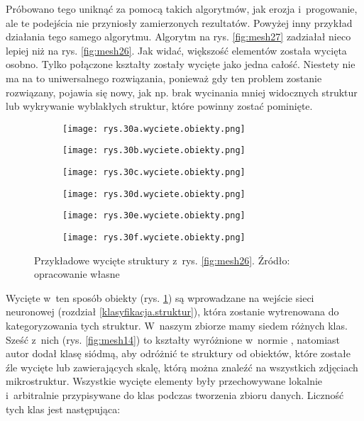 Próbowano tego uniknąć za pomocą takich algorytmów, jak erozja i~progowanie, ale te podejścia nie przyniosły zamierzonych rezultatów. Powyżej inny przykład działania tego samego algorytmu.
Algorytm na rys. \ref{fig:mesh27} zadziałał nieco lepiej niż na rys. \ref{fig:mesh26}. Jak widać, większość elementów została wycięta osobno. Tylko połączone kształty zostały wycięte jako jedna całość. Niestety nie ma na to uniwersalnego rozwiązania, ponieważ gdy ten problem zostanie rozwiązany, pojawia się nowy, jak np. brak wycinania mniej widocznych struktur lub wykrywanie wyblakłych struktur, które powinny zostać pominięte.
\begin{figure}[h]
	\centering
	\begin{subfigure}{0.29\textwidth}
	    \centering
	    \texttt{[image: rys.30a.wyciete.obiekty.png]}
	\end{subfigure}
	\begin{subfigure}{0.29\textwidth}
	    \centering
	    \texttt{[image: rys.30b.wyciete.obiekty.png]}
	\end{subfigure}
	\begin{subfigure}{0.29\textwidth}
	    \centering
	    \texttt{[image: rys.30c.wyciete.obiekty.png]}
	\end{subfigure}
	\begin{subfigure}{0.29\textwidth}
	    \centering
	    \texttt{[image: rys.30d.wyciete.obiekty.png]}
	\end{subfigure}
	\begin{subfigure}{0.29\textwidth}
	    \centering
	    \texttt{[image: rys.30e.wyciete.obiekty.png]}
	\end{subfigure}
	\begin{subfigure}{0.29\textwidth}
	    \centering
	    \texttt{[image: rys.30f.wyciete.obiekty.png]}
	\end{subfigure}
	\caption{\label{fig:mesh28}Przykładowe wycięte struktury z~rys. \ref{fig:mesh26}. Źródło: opracowanie własne}
\end{figure}
Wycięte w~ten sposób obiekty (rys. \ref{fig:mesh28}) są wprowadzane na wejście sieci neuronowej (rozdział \ref{klasyfikacja.struktur}), która zostanie wytrenowana do kategoryzowania tych struktur. W~naszym zbiorze mamy siedem różnych klas. Sześć z~nich (rys. \ref{fig:mesh14}) to kształty wyróżnione w~normie \cite{norma}, natomiast autor dodał klasę siódmą, aby odróżnić te struktury od obiektów, które zostałe źle wycięte lub zawierających skalę, którą można znaleźć na wszystkich zdjęciach mikrostruktur. Wszystkie wycięte elementy były przechowywane lokalnie i~arbitralnie przypisywane do klas podczas tworzenia zbioru danych. Liczność tych klas jest następująca:
